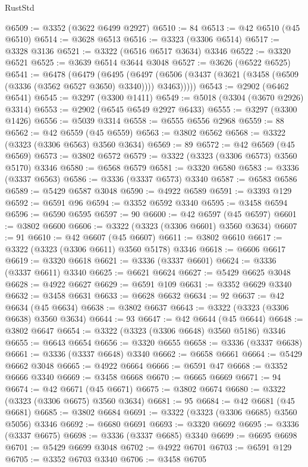 \begin{lexlean}{RustStd}
\begin{coremodule}
@6509 := @3352 (@3622 @6499 @2927)
@6510 := 84
@6513 := @42 @6510 (@45 @6510)
@6514 := @3628 @6513
@6516 := @3323 (@3306 @6514)
@6517 := @3328 @3136
@6521 := @3322 (@6516 @6517 @3634) @3346
@6522 := @3320 @6521
@6525 := @3639 @6514 @3644 @3048
@6527 := @3626 (@6522 @6525)
@6541 := @6478
    (@6479
      (@6495
        (@6497 (@6506 (@3437 (@3621 (@3458 (@6509 (@3336 (@3562 @6527 @3650) @3340)))) @3463)))))
@6543 := @2902 (@6462 @6541)
@6545 := @3297 (@3300 @1411)
@6549 := @5018 (@3304 (@3670 @2926) @3314)
@6553 := @2902 (@6545 @6549 @2927 @6433)
@6555 := @3297 (@3300 @1426)
@6556 := @5039 @3314
@6558 := @6555 @6556 @2968
@6559 := 88
@6562 := @42 @6559 (@45 @6559)
@6563 := @3802 @6562
@6568 := @3322 (@3323 (@3306 @6563) @3560 @3634)
@6569 := 89
@6572 := @42 @6569 (@45 @6569)
@6573 := @3802 @6572
@6579 := @3322 (@3323 (@3306 @6573) @3560 @5170) @3346
@6580 := @6568 @6579
@6581 := @3320 @6580
@6583 := @3336 (@3337 @6563)
@6586 := @3336 (@3337 @6573) @3340
@6587 := @6583 @6586
@6589 := @5429 @6587 @3048
@6590 := @4922 @6589
@6591 := @3393 @129
@6592 := @6591 @96
@6594 := @3352 @6592 @3340
@6595 := @3458 @6594
@6596 := @6590 @6595
@6597 := 90
@6600 := @42 @6597 (@45 @6597)
@6601 := @3802 @6600
@6606 := @3322 (@3323 (@3306 @6601) @3560 @3634)
@6607 := 91
@6610 := @42 @6607 (@45 @6607)
@6611 := @3802 @6610
@6617 := @3322 (@3323 (@3306 @6611) @3560 @5178) @3346
@6618 := @6606 @6617
@6619 := @3320 @6618
@6621 := @3336 (@3337 @6601)
@6624 := @3336 (@3337 @6611) @3340
@6625 := @6621 @6624
@6627 := @5429 @6625 @3048
@6628 := @4922 @6627
@6629 := @6591 @109
@6631 := @3352 @6629 @3340
@6632 := @3458 @6631
@6633 := @6628 @6632
@6634 := 92
@6637 := @42 @6634 (@45 @6634)
@6638 := @3802 @6637
@6643 := @3322 (@3323 (@3306 @6638) @3560 @3634)
@6644 := 93
@6647 := @42 @6644 (@45 @6644)
@6648 := @3802 @6647
@6654 := @3322 (@3323 (@3306 @6648) @3560 @5186) @3346
@6655 := @6643 @6654
@6656 := @3320 @6655
@6658 := @3336 (@3337 @6638)
@6661 := @3336 (@3337 @6648) @3340
@6662 := @6658 @6661
@6664 := @5429 @6662 @3048
@6665 := @4922 @6664
@6666 := @6591 @47
@6668 := @3352 @6666 @3340
@6669 := @3458 @6668
@6670 := @6665 @6669
@6671 := 94
@6674 := @42 @6671 (@45 @6671)
@6675 := @3802 @6674
@6680 := @3322 (@3323 (@3306 @6675) @3560 @3634)
@6681 := 95
@6684 := @42 @6681 (@45 @6681)
@6685 := @3802 @6684
@6691 := @3322 (@3323 (@3306 @6685) @3560 @5056) @3346
@6692 := @6680 @6691
@6693 := @3320 @6692
@6695 := @3336 (@3337 @6675)
@6698 := @3336 (@3337 @6685) @3340
@6699 := @6695 @6698
@6701 := @5429 @6699 @3048
@6702 := @4922 @6701
@6703 := @6591 @129
@6705 := @3352 @6703 @3340
@6706 := @3458 @6705

\end{coremodule}
\end{lexlean}
